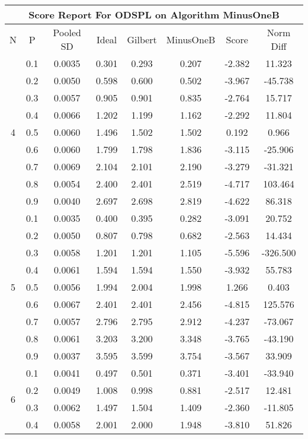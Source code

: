 \documentclass[11pt,a4paper]{report}
\begin{document}
\begin{longtable}{ | c | c || c | c | c | c | c | c | }
\hline
\multicolumn{8}{|c|}{ Score Report For ODSPL on Algorithm MinusOneB} \\
\hline
N & P & Pooled SD &  Ideal &  Gilbert & MinusOneB  & Score & Norm Diff \\
 \hline
 \hline
 \endhead
\multirow{9}{*}{4} & 0.1 & 0.0035 & 0.301 & 0.293 & 0.207 & -2.382 & 11.323 \\
 & 0.2 & 0.0050 & 0.598 & 0.600 & 0.502 & -3.967 & -45.738 \\
 & 0.3 & 0.0057 & 0.905 & 0.901 & 0.835 & -2.764 & 15.717 \\
 & 0.4 & 0.0066 & 1.202 & 1.199 & 1.162 & -2.292 & 11.804 \\
 & 0.5 & 0.0060 & 1.496 & 1.502 & 1.502 & 0.192 & 0.966 \\
 & 0.6 & 0.0060 & 1.799 & 1.798 & 1.836 & -3.115 & -25.906 \\
 & 0.7 & 0.0069 & 2.104 & 2.101 & 2.190 & -3.279 & -31.321 \\
 & 0.8 & 0.0054 & 2.400 & 2.401 & 2.519 & -4.717 & 103.464 \\
 & 0.9 & 0.0040 & 2.697 & 2.698 & 2.819 & -4.622 & 86.318 \\
 \hline
\multirow{9}{*}{5} & 0.1 & 0.0035 & 0.400 & 0.395 & 0.282 & -3.091 & 20.752 \\
 & 0.2 & 0.0050 & 0.807 & 0.798 & 0.682 & -2.563 & 14.434 \\
 & 0.3 & 0.0058 & 1.201 & 1.201 & 1.105 & -5.596 & -326.500 \\
 & 0.4 & 0.0061 & 1.594 & 1.594 & 1.550 & -3.932 & 55.783 \\
 & 0.5 & 0.0056 & 1.994 & 2.004 & 1.998 & 1.266 & 0.403 \\
 & 0.6 & 0.0067 & 2.401 & 2.401 & 2.456 & -4.815 & 125.576 \\
 & 0.7 & 0.0057 & 2.796 & 2.795 & 2.912 & -4.237 & -73.067 \\
 & 0.8 & 0.0061 & 3.203 & 3.200 & 3.348 & -3.765 & -43.190 \\
 & 0.9 & 0.0037 & 3.595 & 3.599 & 3.754 & -3.567 & 33.909 \\
 \hline
\multirow{9}{*}{6} & 0.1 & 0.0041 & 0.497 & 0.501 & 0.371 & -3.401 & -33.940 \\
 & 0.2 & 0.0049 & 1.008 & 0.998 & 0.881 & -2.517 & 12.481 \\
 & 0.3 & 0.0062 & 1.497 & 1.504 & 1.409 & -2.360 & -11.805 \\
 & 0.4 & 0.0058 & 2.001 & 2.000 & 1.948 & -3.810 & 51.826 \\

\end{longtable}
\end{document}
